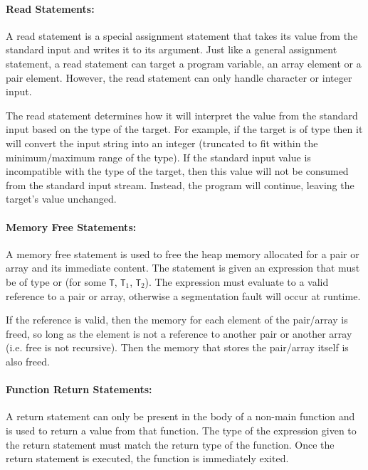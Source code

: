 \documentclass[a4paper]{article}
\theoremstyle{definition}
\begin{document}
\paragraph{Read Statements:}
A read statement  is a special assignment statement that takes its value from the standard input and writes it to its argument.
Just like a general assignment statement, a read statement can target a program variable, an array element or a pair element.
However, the read statement can only handle character or integer input.

The read statement determines how it will interpret the value from the standard input based on the type of the target.
For example, if the target is of type  then it will convert the input string into an integer
(truncated to fit within the minimum/maximum range of the  type).
If the standard input value is incompatible with the type of the target, then this value will not be consumed from the standard input stream.
Instead, the program will continue, leaving the target's value unchanged.



\paragraph{Memory Free Statements:}
A memory free statement  is used to free the heap memory allocated for a pair or array and its immediate content.
The statement is given an expression that must be of type  or  (for some {\tt T}, {\tt T}$_1$, {\tt T}$_2$).
The expression must evaluate to a valid reference to a pair or array, otherwise a segmentation fault will occur at runtime.

If the reference is valid, then the memory for each element of the pair/array is freed, so long as the element is not a reference to another pair or another array
(i.e. free is not recursive).
Then the memory that stores the pair/array itself is also freed.

\paragraph{Function Return Statements:}
A return statement can only be present in the body of a non-main function and is used to return a value from that function.
The type of the expression given to the return statement must match the return type of the function.
Once the return statement is executed, the function is immediately exited.
\end{document}
